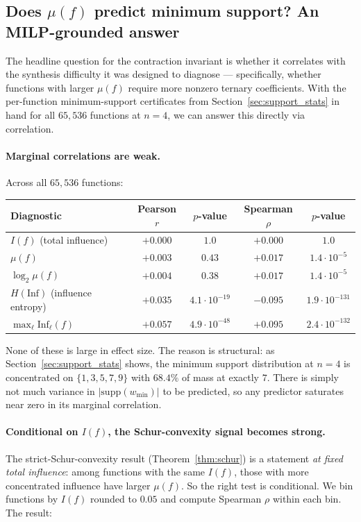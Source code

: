 \documentclass[11pt]{article}
\newcommand{\Inf}{\mathrm{Inf}}
\newcommand{\supp}{\mathrm{supp}}
\begin{document}
\subsection{Does $\mu(f)$ predict minimum support? An MILP-grounded answer}
\label{sec:mu_predicts_support}

The headline question for the contraction invariant is whether it correlates with the synthesis difficulty it was designed to diagnose --- specifically, whether functions with larger $\mu(f)$ require more nonzero ternary coefficients. With the per-function minimum-support certificates from Section~\ref{sec:support_stats} in hand for all $65{,}536$ functions at $n=4$, we can answer this directly via correlation.

\paragraph{Marginal correlations are weak.}
Across all $65{,}536$ functions:
\begin{center}
\small
\begin{tabular}{lcccc}
\toprule
Diagnostic & Pearson $r$ & $p$-value & Spearman $\rho$ & $p$-value \\
\midrule
$I(f)$ (total influence) & $+0.000$ & $1.0$ & $+0.000$ & $1.0$ \\
$\mu(f)$ & $+0.003$ & $0.43$ & $+0.017$ & $1.4{\cdot}10^{-5}$ \\
$\log_2 \mu(f)$ & $+0.004$ & $0.38$ & $+0.017$ & $1.4{\cdot}10^{-5}$ \\
$H(\Inf)$ (influence entropy) & $+0.035$ & $4.1{\cdot}10^{-19}$ & $-0.095$ & $1.9{\cdot}10^{-131}$ \\
$\max_\ell \Inf_\ell(f)$ & $+0.057$ & $4.9{\cdot}10^{-48}$ & $+0.095$ & $2.4{\cdot}10^{-132}$ \\
\bottomrule
\end{tabular}
\end{center}
None of these is large in effect size. The reason is structural: as Section~\ref{sec:support_stats} shows, the minimum support distribution at $n=4$ is concentrated on $\{1,3,5,7,9\}$ with $68.4\%$ of mass at exactly $7$. There is simply not much variance in $|\supp(w_{\min})|$ to be predicted, so any predictor saturates near zero in its marginal correlation.

\paragraph{Conditional on $I(f)$, the Schur-convexity signal becomes strong.}
The strict-Schur-convexity result (Theorem~\ref{thm:schur}) is a statement \emph{at fixed total influence}: among functions with the same $I(f)$, those with more concentrated influence have larger $\mu(f)$. So the right test is conditional. We bin functions by $I(f)$ rounded to $0.05$ and compute Spearman $\rho$ within each bin. The result:
\end{document}
